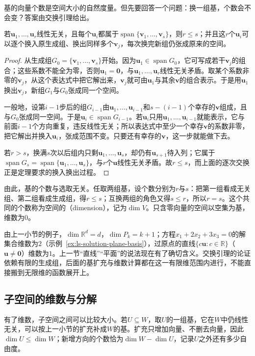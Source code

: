 基的向量个数是空间大小的自然度量。但先要回答一个问题：换一组基，个数会不会变？答案由交换引理给出。
\begin{theorem}[交换引理]
\label{thm:ls-exchange-lemma}
若$\bm u_1,\ldots,\bm u_r$线性无关，且每个$\bm u_i$都属于$\operatorname{span}\{\bm v_1,\ldots,\bm v_s\}$，则$r\leq s$；并且这$r$个$\bm u_i$可以逐个换入原生成组、换出同样多个$\bm v_j$，每次换完新组仍张成原来的空间。
\end{theorem}
\begin{proof}
从生成组$G_0=\{\bm v_1,\ldots,\bm v_s\}$开始。因为$\bm u_1\in\operatorname{span}G_0$，它可写成若干$\bm v_j$的组合；这些系数不能全为零，否则$\bm u_1=\bm0$，与$\bm u_1,\ldots,\bm u_r$线性无关矛盾。取某个系数非零的$\bm v_j$，从这个表达式中把它解出来，$\bm v_j$就可由$\bm u_1$与其余$\bm v$的组合表示。于是用$\bm u_1$换出$\bm v_j$，新组$G_1$与$G_0$张成同一个空间。

一般地，设第$i-1$步后的组$G_{i-1}$由$\bm u_1,\ldots,\bm u_{i-1}$和$s-(i-1)$个幸存的$\bm v$组成，且与$G_0$张成同一空间。于是$\bm u_i\in\operatorname{span}G_{i-1}$。若$\bm u_i$只用$\bm u_1,\ldots,\bm u_{i-1}$就能表示，它与前面$i-1$个方向重复，违反线性无关；所以表达式中至少一个幸存$\bm v$的系数非零，把它解出并换入$\bm u_i$，张成范围不变。只要还有幸存的$\bm v$，这一步就能做下去。

若$r>s$，换满$s$次以后组内只剩$\bm u_1,\ldots,\bm u_s$，却仍有$\bm u_{s+1}$待入列；它属于$\operatorname{span}G_s=\operatorname{span}\{\bm u_1,\ldots,\bm u_s\}$，与$r$个$\bm u$线性无关矛盾。故$r\leq s$，而上面的逐次交换正是定理要求的换入换出过程。
\end{proof}

由此，基的个数与选取无关。任取两组基，设个数分别为$r$与$s$：把第一组看成无关组、第二组看成生成组，得$r\leq s$；互换两组的角色又得$s\leq r$，所以$r=s$。这个共同的个数称为空间的（dimension），记为$\dim V$。只含零向量的空间以空集为基，维数为$0$。

由上一小节的例子，$\dim\mathbb R^d=d$，$\dim P_k=k+1$；方程$x_1+2x_2+3x_3=0$的解集合维数为$2$（示例~\ref{ex:ls-solution-plane-basis}），过原点的直线$\{c\bm u:c\in\mathbb R\}$（$\bm u\neq\bm0$）维数为$1$。上一节“直线”“平面”的说法现在有了确切含义。交换引理的论证依赖有限的生成组，后面的基扩充与维数计算都在这一有限维范围内进行，不能直接搬到无限维的函数展开上。

\subsection{子空间的维数与分解}
有了维数，子空间之间可以比较大小。若$U\subseteq W$，取$U$的一组基，它在$W$中仍线性无关，可以按上一小节的扩充补成$W$的基。扩充只增加向量、不删去向量，因此$\dim U\leq\dim W$；新增方向的个数恰为$\dim W-\dim U$，记录$U$之外还有多少自由度。

